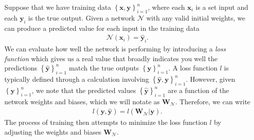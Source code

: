 \documentclass{somasmsc}
\begin{document}
Suppose that we have training data $\left\{\pmb{x}, \pmb{y}\right\}_{i=1}^n$, where each $\pmb{x}_i$ is a set input and each $\pmb{y}_i$ is the true output. Given a network $\mathcal{N}$ with any valid initial weights, we can produce a predicted value for each input in the training data
\begin{align*}
\mathcal{N}\left(\pmb{x}_i\right) = \hat{\pmb{y}}_i.
\end{align*}
We can evaluate how well the network is performing by introducing a \textit{loss function} which gives us a real value that broadly indicates you well the predictions $\left\{\hat{\pmb{y}}\right\}_{i=1}^n$ match the true outputs $\left\{\pmb{y}\right\}_{i=1}^n$. A loss function $l$ is typically defined through a calculation involving $\left\{\hat{\pmb{y}}, \pmb{y}\right\}_{i=1}^n$. However, given $\left\{\pmb{y}\right\}_{i=1}^n$, we note that the predicted values $\left\{\hat{\pmb{y}}\right\}_{i=1}^n$ are a function of the network weights and biases, which we will notate as $\mathbf{W}_{\mathcal{N}}$. Therefore, we can write
\begin{align*}
l\left(\pmb{y}, \hat{\pmb{y}}\right) = l\left(\mathbf{W}_{\mathcal{N}} | \pmb{y}\right).
\end{align*}
The process of training then attempts to minimize the loss function $l$ by adjusting the weights and biases $\mathbf{W}_{\mathcal{N}}$.
\end{document}
